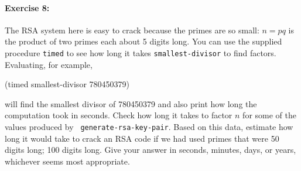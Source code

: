\paragraph{Exercise 8:}
The RSA system here is easy to crack because the primes are so small:
$n=pq$ is the product of two primes each about 5 digits long.  You
can use the supplied procedure {\tt timed} to see how long it takes
{\tt smallest-divisor} to find factors.  Evaluating, for example,

\beginlisp
(timed smallest-divisor 780450379)
\endlisp

\noindent
will find the smallest divisor of 780450379 and also print
how long the computation took in seconds.  Check how long it takes
to factor $n$ for some of the values produced by {\tt
generate-rsa-key-pair}.  Based on this data, estimate how long it would
take to crack an RSA code if we had used primes that were 50 digits
long; 100 digits long.  Give your answer in seconds, minutes, days,
or years, whichever seems most appropriate.







